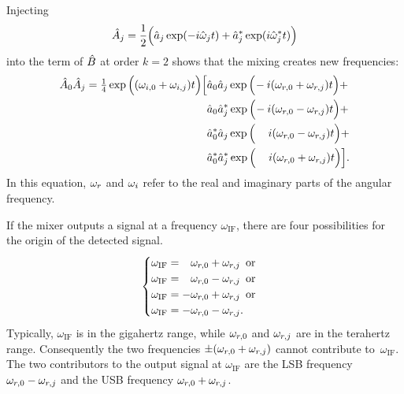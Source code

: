 Injecting
\begin{equation}
    \hat{A}_j
    =
    \frac{1}{2}
    \Big(
        \hat{a}_j \exp(-i \hat{\omega}_j t)
        +
        \hat{a}_j^* \exp(i \hat{\omega}_j^* t)
    \Big)
\end{equation}
into the term of $\hat{B}$ at order $k=2$ shows that the mixing creates new frequencies:
\begin{equation}
\begin{split}
    \hat{A}_0 \hat{A}_{j}
    =
    \tfrac{1}{4}
    \exp \Big((\omega_{i,0}+\omega_{i,j})t \Big)
    \Big[
    &\hat{a}_0   \hat{a}_{j}   \exp \Big(\!                    -i (\omega_{r,0} + \omega_{r,j}) t \Big) + \\
    &\hat{a}_0   \hat{a}_{j}^* \exp \Big(\!                    -i (\omega_{r,0} - \omega_{r,j}) t \Big) + \\
    &\hat{a}_0^* \hat{a}_{j}   \exp \Big(\!\mathrel{\phantom{-}}i (\omega_{r,0} - \omega_{r,j}) t \Big) + \\
    &\hat{a}_0^* \hat{a}_{j}^* \exp \Big(\!\mathrel{\phantom{-}}i (\omega_{r,0} + \omega_{r,j}) t \Big)
    \Big]
    \text{.}
\end{split}
\label{eq:four_frequencies}
\end{equation}
In this equation, $\omega_r$ and $\omega_i$ refer to the real and imaginary parts of the angular frequency.

If the mixer outputs a signal at a frequency $\omega_\text{IF}$, there are four possibilities for the origin of the detected signal.
\begin{equation*}
    \begin{cases}
        \omega_\text{IF} = \phantom{-} \omega_{r, 0} + \omega_{r, j} \enskip \text{or} \\
        \omega_\text{IF} = \phantom{-} \omega_{r, 0} - \omega_{r, j} \enskip \text{or} \\
        \omega_\text{IF} = -           \omega_{r, 0} + \omega_{r, j} \enskip \text{or} \\
        \omega_\text{IF} = -           \omega_{r, 0} - \omega_{r, j} \text{.}
    \end{cases}
\end{equation*}
Typically, $\omega_\text{IF}$ is in the gigahertz range, while $\omega_{r, 0}$ and $\omega_{r, j}$ are in the terahertz range.
Consequently the two frequencies $\pm(\omega_{r, 0} + \omega_{r, j})$ cannot contribute to~$\omega_\text{IF}$.
The two contributors to the output signal at $\omega_\text{IF}$ are the LSB frequency $\omega_{r, 0} - \omega_{r, j}$ and the USB frequency $\omega_{r, 0} + \omega_{r, j}$.

